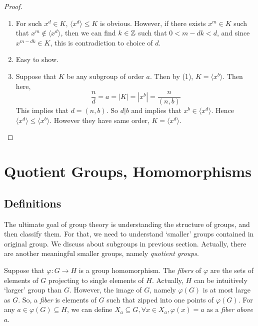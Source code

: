 \documentclass[12pt, a4paper, openany, twoside]{book}
\theoremstyle{definition}
\theoremstyle{remark}
\theoremstyle{plain}
\numberwithin{equation}{section}
\begin{document}
\begin{proof}
    
\begin{enumerate}
    \item For such $x^d \in K$, $\langle x^d \rangle \leq K$ is obvious. However, if there exists $x^m \in K$ such that $x^m \notin \langle x^d \rangle$, 
    then we can find $k \in {\mathbb {Z}}$ such that $0 < m - dk < d$, and since $x^{m - dk} \in K$, this is contradiction to choice of $d$. 
    \item Easy to show. 
    \item Suppose that $K$ be any subgroup of order $a$. Then by (1), $K = \langle x^b \rangle$. Then here, 
    \[\frac{n}{d} = a = |K| = |x^b| = \frac{n}{(n, b)}\]
    This implies that $d = (n, b)$. So $d | b$ and implies that $x^b \in \langle x^d \rangle$. Hence $\langle x^d \rangle \leq \langle x^b \rangle$. However they have 
    same order, $K = \langle x^d \rangle$. 
\end{enumerate}

\end{proof}

\begin{tcolorbox}[colback=yellow!10!white,colframe=violet!75!white,title=Exercise Sec 2.3.,breakable]
\end{tcolorbox}

\chapter{Quotient Groups, Homomorphisms}

\section{Definitions}

The ultimate goal of group theory is understanding the structure of groups, and then classify them. For that, 
we need to understand \lq smaller' groups contained in original group. We discuss about subgroups in previous section. 
Actually, there are another meaningful smaller groups, namely \textit{quotient groups}.  

\begin{tcolorbox}[colback=yellow!10!white,colframe=brown!75!black,title=Fibers and Homomorphism]

Suppose that $\varphi: G \rightarrow H$ is a group homomorphism. The \textit{fibers} of $\varphi$ are 
the sets of elements of $G$ projecting to single elements of $H$. Actually, $H$ can be intuitively \lq larger' group than $G$. 
However, the image of $G$, namely $\varphi(G)$ is at most large as $G$. So, a \textit{fiber} is
elements of $G$ such that zipped into one points of $\varphi(G)$. 
For any $a \in \varphi(G) \subseteq H$, we can define $X_a \subseteq G, \forall x \in X_a, \varphi(x) = a$ as a \textit{fiber above} $a$.  
\end{tcolorbox}
\end{document}
